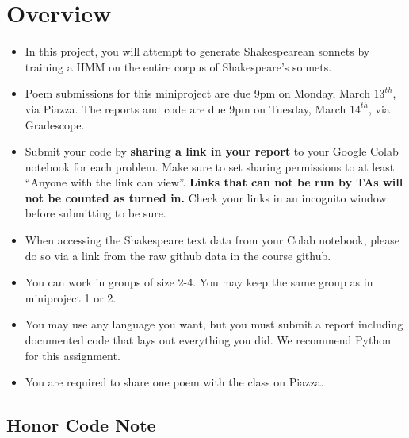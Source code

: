 \newif\ifshowsolutions
\showsolutionsfalse




\pagestyle{fancy}
\section{Overview}
\begin{itemize}
\item In this project, you will attempt to generate Shakespearean sonnets by training a HMM on the entire corpus of Shakespeare's sonnets.

\item Poem submissions for this miniproject are due 9pm on Monday, March $13^{th}$, via Piazza. The reports and code are due 9pm on Tuesday, March $14^{th}$, via Gradescope.

\item Submit your code by \textbf{sharing a link in your report} to your Google Colab notebook for each problem. Make sure to set sharing permissions to at least ``Anyone with the link can view''. \textbf{Links that can not be run by TAs will not be counted as turned in.} Check your links in an incognito window before submitting to be sure.

\item When accessing the Shakespeare text data from your Colab notebook, please do so via a link from the raw github data in the course github.

\item You can work in groups of size 2-4.  You may keep the same group as in miniproject 1 or 2.

\item You may use any language you want, but you must submit a report including documented code that lays out everything you did. We recommend Python for this assignment.

\item You are required to share one poem with the class on Piazza.

\end{itemize}

\subsection{Honor Code Note}

